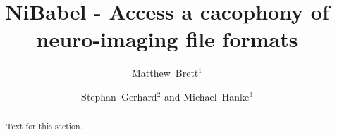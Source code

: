 \documentclass[10pt]{bmc_article}
\newenvironment{bmcformat}{\baselineskip20pt\sloppy\setboolean{publ}{false}}{\baselineskip20pt\sloppy}
\begin{document}
\begin{bmcformat}

\title{NiBabel - Access a cacophony of neuro-imaging file formats}



\author{Matthew~Brett\correspondingauthor$^1$%
       \and
         Stephan~Gerhard$^2$ %
       and
         Michael~Hanke$^3$%
      }

\address{%
    \iid(1)Helen Wills Neuroscience Institute, University of California at
Berkeley, USA\\
    \iid(2)Institute of Neuroinformatics, University Zurich and Swiss Federal Institute of Technology, Zurich, Switzerland\\
    \iid(3)Department of Experimental Psychology, University of Magdeburg,
Magdeburg, Germany}%

\maketitle



\begin{abstract}
Text for this section.        
\end{abstract}



\end{bmcformat}
\end{document}
